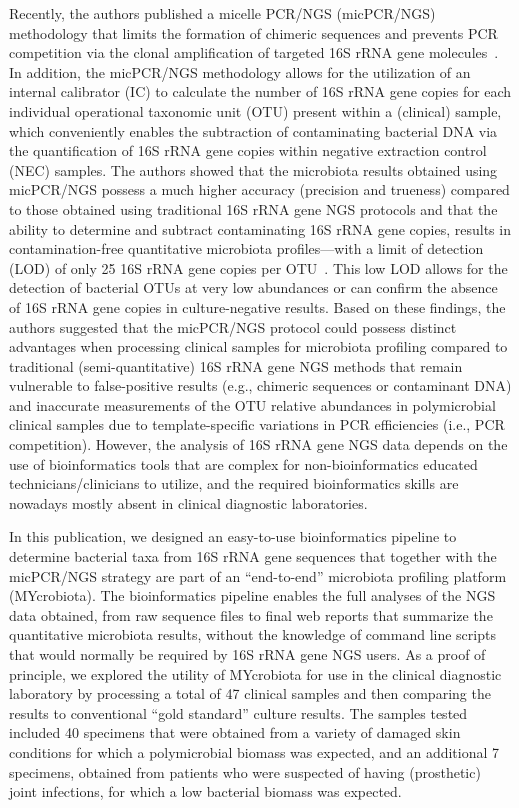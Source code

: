 Recently, the authors published a micelle PCR/NGS (micPCR/NGS) methodology that limits the formation of chimeric sequences
and prevents PCR competition via the clonal amplification of targeted 16S rRNA gene molecules~\cite{boers2015micelle}. In addition, the micPCR/NGS
methodology allows for the utilization of an internal calibrator (IC) to calculate the number of 16S rRNA gene copies for each
individual operational taxonomic unit (OTU) present within a (clinical) sample, which conveniently enables the subtraction of
contaminating bacterial DNA via the quantification of 16S rRNA gene copies within negative extraction control (NEC) samples.
The authors showed that the microbiota results obtained using micPCR/NGS possess a much higher accuracy (precision and trueness)
compared to those obtained using traditional 16S rRNA gene NGS protocols and that the ability to determine and subtract contaminating
16S rRNA gene copies, results in contamination-free quantitative microbiota profiles—with a limit of detection (LOD) of only 25 16S
rRNA gene copies per OTU~\cite{boers2017novel}. This low LOD allows for the detection of bacterial OTUs at very low abundances or can confirm the absence
of 16S rRNA gene copies in culture-negative results. Based on these findings, the authors suggested that the micPCR/NGS protocol could
possess distinct advantages when processing clinical samples for microbiota profiling compared to traditional (semi-quantitative) 16S
rRNA gene NGS methods that remain vulnerable to false-positive results (e.g., chimeric sequences or contaminant DNA) and inaccurate
measurements of the OTU relative abundances in polymicrobial clinical samples due to template-specific variations in PCR efficiencies
(i.e., PCR competition). However, the analysis of 16S rRNA gene NGS data depends on the use of bioinformatics tools that are complex
for non-bioinformatics educated technicians/clinicians to utilize, and the required bioinformatics skills are nowadays mostly absent
in clinical diagnostic laboratories.

In this publication, we designed an easy-to-use bioinformatics pipeline to determine bacterial taxa from 16S rRNA gene sequences that
together with the micPCR/NGS strategy are part of an “end-to-end” microbiota profiling platform (MYcrobiota). The bioinformatics pipeline
enables the full analyses of the NGS data obtained, from raw sequence files to final web reports that summarize the quantitative
microbiota results, without the knowledge of command line scripts that would normally be required by 16S rRNA gene NGS users. As a
proof of principle, we explored the utility of MYcrobiota for use in the clinical diagnostic laboratory by processing a total of 47
clinical samples and then comparing the results to conventional “gold standard” culture results. The samples tested included 40
specimens that were obtained from a variety of damaged skin conditions for which a polymicrobial biomass was expected, and an
additional 7 specimens, obtained from patients who were suspected of having (prosthetic) joint infections, for which a low bacterial
biomass was expected.

